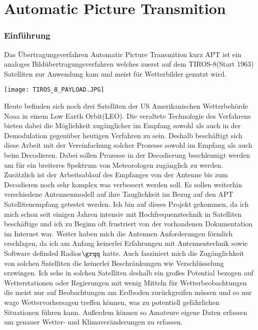 

\part{\glqq Automatic Picture Transmition\grqq}
\section[Charakteristiken]{Einführung}
\begin{multicols}{2}

    Das Übertragungsverfahren \glqq Automatic Picture Transmition \grqq kurz APT ist ein analoges Bildübertragungsverfahren welches zuerst auf dem TIROS-8(Start 1963) Satelliten zur Anwendung kam und meist für Wetterbilder genutzt wird. 
    \begin{center}
        \centering
        \texttt{[image: TIROS\_8\_PAYLOAD.JPG]}
    \end{center}
    Heute befinden sich noch drei Satelliten der US Amerikanischen Wetterbehörde Noaa in einem \glqq Low Earth Orbit\grqq(LEO). Die veraltete Technologie des Verfahrens bieten dabei die Möglichkeit zugänglicher im Empfang sowohl als auch in der Demodulation gegenüber heutigen Verfahren zu sein. Deshalb beschäftigt sich diese Arbeit mit der Vereinfachung solcher Prozesse sowohl im Empfang als auch beim Decodieren. Dabei sollen Prozesse in der Decodierung beschleunigt werden um für ein breiteres Spektrum von Meteorologen zugänglich zu werden. Zusätzlich ist der Arbeitsablauf des Empfanges von der Antenne bis zum Decodieren noch sehr komplex was verbessert werden soll. Es sollen weiterhin verschiedene Antennenmodell auf ihre Tauglichkeit im Bezug auf den APT Satellitenempfang getestet werden. Ich bin auf dieses Projekt gekommen, da ich mich schon seit einigen Jahren intensiv mit Hochfrequenztechnik in Satelliten beschäftige und ich zu Beginn oft frustriert von der vorhandenen Dokumentation im Internet war. Weiter haben mich die Antennen Anforderungen förmlich erschlagen, da ich am Anfang keinerlei Erfahrungen mit Antennentechnik sowie \glqq Software definded Radios\( \grqq \)   hatte. Auch fasziniert mich die Zugänglichkeit von solchen Satelliten die keinerlei Beschränkungen wie Verschlüsselung erzwingen. Ich sehe in solchen Satelliten deshalb ein großes Potential bezogen auf Wetterstationen oder Regierungen mit wenig Mitteln für Wetterbeobachtungen die meist nur auf Beobachtungen am Erdboden zurückgreifen müssen und so nur wage Wettervorhersagen treffen können, was zu potentiell gefährlichen Situationen führen kann. Außerdem können so Amateure eigene Daten erfassen um genauer Wetter- und Klimaveränderungen zu erfassen.  

\end{multicols}
